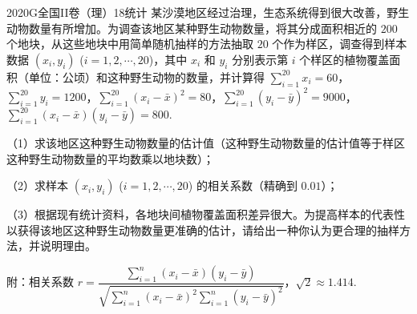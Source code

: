 
\begin{problem}{2020}{G}{全国II卷（理）}{18}{统计}
某沙漠地区经过治理，生态系统得到很大改善，野生动物数量有所增加。为调查该地区某种野生动物数量，将其分成面积相近的 $ 200 $ 个地块，从这些地块中用简单随机抽样的方法抽取 $ 20 $ 个作为样区，调查得到样本数据 $ (x_i, y_i) $ ($ i = 1, 2, \cdots, 20 $)，其中 $ x_i $ 和 $ y_i $ 分别表示第 $ i $ 个样区的植物覆盖面积（单位：公顷）和这种野生动物的数量，并计算得 $ \displaystyle\sum_{i=1}^{20} x_i = 60 $，$ \displaystyle\sum_{i=1}^{20} y_i = 1200 $，$ \displaystyle\sum_{i=1}^{20} (x_i - \bar{x})^2 = 80 $，$ \displaystyle\sum_{i=1}^{20} (y_i - \bar{y})^2 = 9000 $，$ \displaystyle\sum_{i=1}^{20} (x_i - \bar{x})(y_i - \bar{y}) = 800 $.

（1）求该地区这种野生动物数量的估计值（这种野生动物数量的估计值等于样区这种野生动物数量的平均数乘以地块数）；

（2）求样本 $ (x_i, y_i) $ ($ i = 1, 2, \cdots, 20 $) 的相关系数（精确到 $ 0.01 $）；

（3）根据现有统计资料，各地块间植物覆盖面积差异很大。为提高样本的代表性以获得该地区这种野生动物数量更准确的估计，请给出一种你认为更合理的抽样方法，并说明理由。

附：相关系数 $ r = \dfrac{\displaystyle\sum_{i=1}^{n} (x_i - \bar{x})(y_i - \bar{y})}{\sqrt{\displaystyle\sum_{i=1}^{n} (x_i - \bar{x})^2 \displaystyle\sum_{i=1}^{n} (y_i - \bar{y})^2}} $，$ \sqrt{2} \approx 1.414 $.
\end{problem}

\begin{answer}

\end{answer}

\begin{solutions}

\end{solutions}